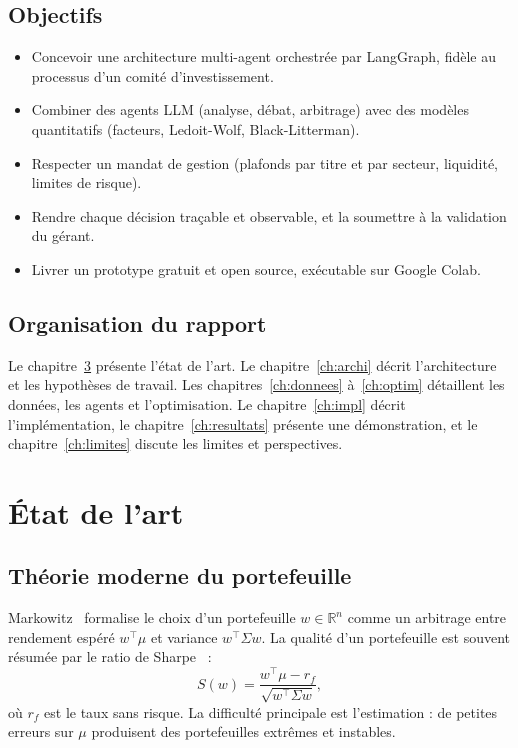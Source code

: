 \documentclass[11pt,a4paper]{report}
\begin{document}
\section{Objectifs}
\begin{itemize}
  \item Concevoir une architecture multi-agent orchestrée par LangGraph, fidèle au processus d'un comité d'investissement.
  \item Combiner des agents LLM (analyse, débat, arbitrage) avec des modèles quantitatifs (facteurs, Ledoit-Wolf, Black-Litterman).
  \item Respecter un mandat de gestion (plafonds par titre et par secteur, liquidité, limites de risque).
  \item Rendre chaque décision traçable et observable, et la soumettre à la validation du gérant.
  \item Livrer un prototype gratuit et open source, exécutable sur Google Colab.
\end{itemize}

\section{Organisation du rapport}
Le chapitre~\ref{ch:etat} présente l'état de l'art. Le chapitre~\ref{ch:archi} décrit l'architecture et les
hypothèses de travail. Les chapitres~\ref{ch:donnees} à~\ref{ch:optim} détaillent les données, les agents et
l'optimisation. Le chapitre~\ref{ch:impl} décrit l'implémentation, le chapitre~\ref{ch:resultats} présente une
démonstration, et le chapitre~\ref{ch:limites} discute les limites et perspectives.

\chapter{État de l'art}\label{ch:etat}

\section{Théorie moderne du portefeuille}
Markowitz~\cite{markowitz} formalise le choix d'un portefeuille $w\in\mathbb{R}^n$ comme un arbitrage entre
rendement espéré $w^\top\mu$ et variance $w^\top\Sigma w$. La qualité d'un portefeuille est souvent résumée par
le ratio de Sharpe~\cite{sharpe} :
\begin{equation}
  S(w) = \frac{w^\top \mu - r_f}{\sqrt{w^\top \Sigma w}},
\end{equation}
où $r_f$ est le taux sans risque. La difficulté principale est l'estimation : de petites erreurs sur $\mu$ produisent
des portefeuilles extrêmes et instables.
\end{document}
